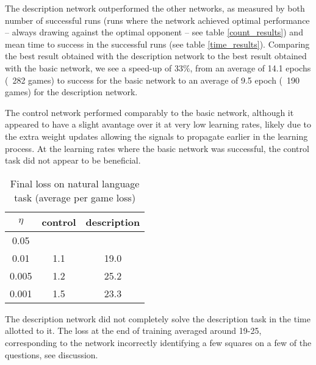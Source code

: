 \documentclass{article} %
\begin{document}
The description network outperformed the other networks, as measured by both number of successful runs (runs where the network achieved optimal performance -- always drawing against the optimal opponent -- see table \ref{count_results}) and mean time to success in the successful runs (see table \ref{time_results}). Comparing the best result obtained with the description network to the best result obtained with the basic network, we see a speed-up of 33\%, from an average of 14.1 epochs (~282 games) to success for the basic network to an average of 9.5 epoch (~190 games) for the description network. \par %
The control network performed comparably to the basic network, although it appeared to have a slight avantage over it at very low learning rates, likely due to the extra weight updates allowing the signals to propagate earlier in the learning process. At the learning rates where the basic network was successful, the control task did not appear to be beneficial. \par
\begin{table}[H]
\centering
\begin{tabular}{|c|cc|}
\hline
\(\eta\) & control & description \\ 
\hline
0.05 & & \\
0.01 & 1.1 & 19.0  \\ 
0.005 & 1.2 & 25.2  \\ 
0.001 & 1.5 & 23.3 \\ 
\hline 
\end{tabular}
\caption{Final loss on natural language task (average per game loss)}
\label{npl_loss`}
\end{table}
The description network did not completely solve the description task in the time allotted to it. The loss at the end of training averaged around 19-25, corresponding to the network incorrectly identifying a few squares on a few of the questions, see discussion. \par
\end{document}
